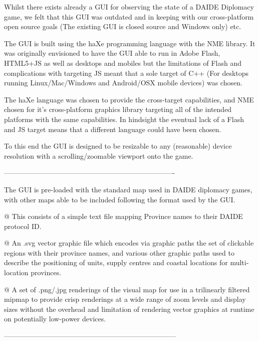 \documentclass[pdftex,12pt,a4paper]{report}
\begin{document}




Whilst there exists already a GUI for observing the state of a DAIDE Diplomacy game, we felt that this GUI was outdated and in keeping with our cross-platform open source goals (The existing GUI is closed source and Windows only) etc.

The GUI is built using the haXe programming language with the NME library. It was originally envisioned to have the GUI able to run in Adobe Flash, HTML5+JS as well as desktops and mobiles but the limitations of Flash and complications with targeting JS meant that a sole target of C++ (For desktops running Linux/Mac/Windows and Android/OSX mobile devices) was chosen.

The haXe language was chosen to provide the cross-target capabilities, and NME chosen for it's cross-platform graphics library targeting all of the intended platforms with the same capabilities. In hindsight the eventual lack of a Flash and JS target means that a different language could have been chosen.

To this end the GUI is designed to be resizable to any (reasonable) device resolution with a scrolling/zoomable viewport onto the game.

-------------------------------------------------------------------------

The GUI is pre-loaded with the standard map used in DAIDE diplomacy games, with other maps able to be included following the format used by the GUI.

@ This consists of a simple text file mapping Province names to their DAIDE protocol ID.

@ An .svg vector graphic file which encodes via graphic paths the set of clickable regions with their province names, and various other graphic paths used to describe the positioning of units, supply centres and coastal locations for multi-location provinces.

@ A set of .png/.jpg renderings of the visual map for use in a trilinearly filtered mipmap to provide crisp renderings at a wide range of zoom levels and display sizes without the overhead and limitation of rendering vector graphics at runtime on potentially low-power devices.

--------------------------------------------------------------------------
\end{document}
